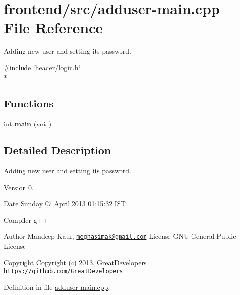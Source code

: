 \hypertarget{adduser-main_8cpp}{\section{frontend/src/adduser-\/main.cpp File Reference}
\label{adduser-main_8cpp}
}


Adding new user and setting its password.  


{\ttfamily \#include \char`\"{}header/login.\-h\char`\"{}}\\*
\subsection*{Functions}
\begin{DoxyCompactItemize}
\item 
\hypertarget{adduser-main_8cpp_a840291bc02cba5474a4cb46a9b9566fe}{int {\bfseries main} (void)}\label{adduser-main_8cpp_a840291bc02cba5474a4cb46a9b9566fe}

\end{DoxyCompactItemize}


\subsection{Detailed Description}
Adding new user and setting its password. \begin{DoxyVersion}{Version}
0. 
\end{DoxyVersion}
\begin{DoxyDate}{Date}
Sunday 07 April 2013 01\-:15\-:32 I\-S\-T\par
 Compiler g++
\end{DoxyDate}
\begin{DoxyAuthor}{Author}
Mandeep Kaur, \href{mailto:meghasimak@gmail.com}{\tt meghasimak@gmail.\-com} License G\-N\-U General Public License 
\end{DoxyAuthor}
\begin{DoxyCopyright}{Copyright}
Copyright (c) 2013, Great\-Developers \href{https://github.com/GreatDevelopers}{\tt https\-://github.\-com/\-Great\-Developers} 
\end{DoxyCopyright}


Definition in file \hyperlink{adduser-main_8cpp_source}{adduser-\/main.\-cpp}.

